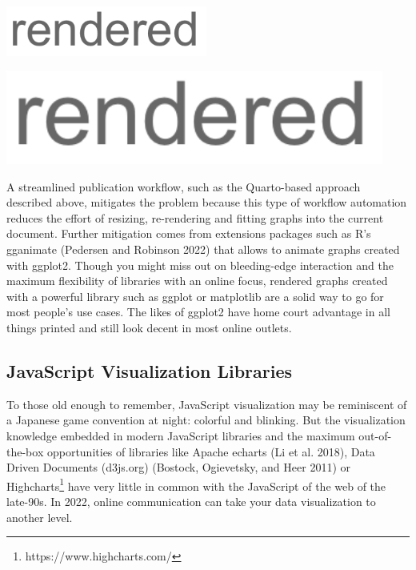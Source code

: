 \documentclass[
  12pt,
  letterpaper,
]{krantz}
\begin{document}
\includegraphics[width=2.60417in,height=\textheight]{./images/rendered.png}

\includegraphics[width=4.89583in,height=\textheight]{./images/rendered.png}

A streamlined publication workflow, such as the
Quarto-based approach described above, mitigates the
problem because this type of workflow automation
reduces the effort of resizing, re-rendering and fitting graphs into the
current document. Further mitigation comes from extensions packages such
as R's gganimate (Pedersen and Robinson 2022) that allows to animate
graphs created with ggplot2. Though you might miss out on bleeding-edge
interaction and the maximum flexibility of libraries with an online
focus, rendered graphs created with a powerful library such as ggplot or
matplotlib are a solid way to go for most people's use cases. The likes
of ggplot2 have home court advantage in all things printed and still
look decent in most online outlets.

\hypertarget{javascript-visualization-libraries}{%
\subsection{\texorpdfstring{JavaScript Visualization
Libraries}{JavaScript Visualization Libraries}}\label{javascript-visualization-libraries}}

To those old enough to remember, JavaScript visualization may be
reminiscent of a Japanese game convention at night: colorful and
blinking. But the visualization knowledge embedded in modern JavaScript
libraries and the maximum out-of-the-box opportunities of libraries like
Apache echarts (Li et al. 2018), Data Driven Documents
(d3js.org) (Bostock, Ogievetsky, and Heer 2011) or Highcharts\footnote{https://www.highcharts.com/}
have very little in common with the JavaScript of the web of the
late-90s. In 2022, online communication can take your data visualization
to another level.
\end{document}
